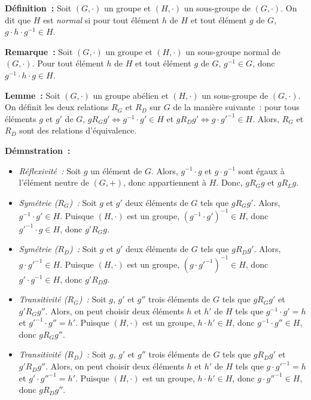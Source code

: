 \noindent\textbf{Définition :}  Soit $(G, \cdot)$ un groupe et $(H, \cdot)$ un sous-groupe de $(G, \cdot)$.
    On dit que $H$ est \emph{normal} si pour tout élément $h$ de $H$ et tout élément $g$ de $G$, $g \cdot h \cdot g^{-1} \in H$. 

\medskip

\noindent\textbf{Remarque :} Soit $(G, \cdot)$ un groupe et $(H, \cdot)$ un sous-groupe normal de $(G, \cdot)$.
    Pour tout élément $h$ de $H$ et tout élément $g$ de $G$, $g^{-1} \in G$, donc $g^{-1} \cdot h \cdot g \in H$.

\medskip

\noindent\textbf{Lemme :} Soit $(G, \cdot)$ un groupe abélien et $(H, \cdot)$ un sous-groupe de $(G, \cdot)$.
    On définit les deux relations $R_G$ et $R_D$ sur $G$ de la manière suivante : pour tous éléments $g$ et $g'$ de $G$, $g R_G g' \Leftrightarrow g^{-1} \cdot g' \in H$ et $g R_D g' \Leftrightarrow g \cdot g'^{-1} \in H$. 
    Alors, $R_G$ et $R_D$ sont des relations d'équivalence. 

\medskip

\noindent\textbf{Démnstration :} 
\begin{itemize}[nosep]
    \item \emph{Réflexivité :} Soit $g$ un élément de $G$.
        Alors, $g^{-1} \cdot g$ et $g \cdot g^{-1}$ sont égaux à l'élément neutre de $(G, +)$, donc appartiennent à $H$.
        Donc, $g R_G g$ et $g R_L g$.
    \item \emph{Symétrie ($R_G$) :} Soit $g$ et $g'$ deux éléments de $G$ tels que $g R_G g'$.
        Alors, $g^{-1} \cdot g' \in H$.
        Puisque $(H, \cdot)$ est un groupe, $(g^{-1} \cdot g')^{-1} \in H$, donc $g'^{-1} \cdot g \in H$, donc $g' R_G g$.
    \item \emph{Symétrie ($R_D$) :} Soit $g$ et $g'$ deux éléments de $G$ tels que $g R_D g'$.
        Alors, $g \cdot g'^{-1} \in H$.
        Puisque $(H, \cdot)$ est un groupe, $(g \cdot g'^{-1})^{-1} \in H$, donc $g' \cdot g^{-1} \in H$, donc $g' R_D g$.
    \item \emph{Transitivité ($R_G$) :} Soit $g$, $g'$ et $g''$ trois éléments de $G$ tels que $g R_G g'$ et $g' R_G g''$.
        Alors, on peut choisir deux éléments $h$ et $h'$ de $H$ tels que $g^{-1} \cdot g' = h$ et $g'^{-1} \cdot g'' = h'$.
        Puisque $(H, \cdot)$ est un groupe, $h \cdot h' \in H$, donc $g^{-1} \cdot g'' \in H$, donc $g R_G g''$.
    \item \emph{Transitivité ($R_D$) :} Soit $g$, $g'$ et $g''$ trois éléments de $G$ tels que $g R_D g'$ et $g' R_D g''$.
        Alors, on peut choisir deux éléments $h$ et $h'$ de $H$ tels que $g \cdot g'^{-1} = h$ et $g' \cdot g''^{-1} = h'$.
        Puisque $(H, \cdot)$ est un groupe, $h \cdot h' \in H$, donc $g \cdot g''^{-1} \in H$, donc $g R_D g''$.
\end{itemize}

